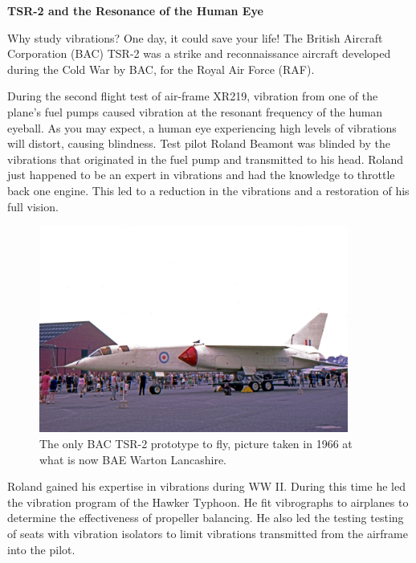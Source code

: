 \documentclass[12pt,letter]{article}
\begin{document}
	\begin{vibration_case_study}
		
			\textbf{TSR-2 and the Resonance of the Human Eye}

		\noindent Why study vibrations? One day, it could save your life! The British Aircraft Corporation (BAC) TSR-2 was a strike and reconnaissance aircraft developed during the Cold War by BAC, for the Royal Air Force (RAF). 
		
		During the second flight test of air-frame XR219, vibration from one of the plane's fuel pumps caused vibration at the resonant frequency of the human eyeball. As you may expect, a human eye experiencing high levels of vibrations will distort, causing blindness. Test pilot Roland Beamont was blinded by the vibrations that originated in the fuel pump and transmitted to his head. Roland just happened to be an expert in vibrations and had the knowledge to throttle back one engine. This led to a reduction in the vibrations and a restoration of his full vision. 

		\begin{figure}[H]
			\centering
			\includegraphics[width=4in]{../figures/TSR_2.jpg}
			\caption{The only BAC TSR-2 prototype to fly, picture taken in 1966 at what is now BAE Warton Lancashire.\protect\footnotemark[1]}
		\end{figure}
				
		Roland gained his expertise in vibrations during WW II. During this time he led the vibration program of the Hawker Typhoon. He fit vibrographs to airplanes to determine the effectiveness of propeller balancing. He also led the testing testing of seats with vibration isolators to limit vibrations transmitted from the airframe into the pilot. 


	\end{vibration_case_study}
\end{document}
